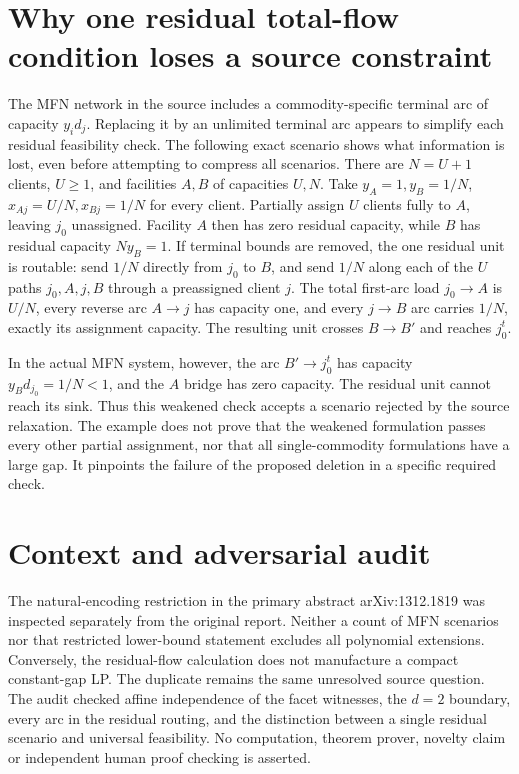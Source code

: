 \documentclass[11pt]{article}
\begin{document}
\section{Why one residual total-flow condition loses a source constraint}
The MFN network in the source includes a commodity-specific terminal arc
of capacity $y_i d_j$. Replacing it by an unlimited terminal arc appears to
simplify each residual feasibility check. The following exact scenario shows
what information is lost, even before attempting to compress all scenarios.
There are $N=U+1$ clients, $U\ge1$, and facilities $A,B$ of capacities $U,N$.
Take $y_A=1,y_B=1/N$, $x_{Aj}=U/N,x_{Bj}=1/N$ for every client.
Partially assign $U$ clients fully to $A$, leaving $j_0$ unassigned.
Facility $A$ then has zero residual capacity, while $B$ has residual capacity
$Ny_B=1$. If terminal bounds are removed, the one residual unit is routable:
send $1/N$ directly from $j_0$ to $B$, and send $1/N$ along each of the $U$
paths $j_0,A,j,B$ through a preassigned client $j$. The total first-arc load
$j_0\to A$ is $U/N$, every reverse arc $A\to j$ has capacity one,
and every $j\to B$ arc carries $1/N$, exactly its assignment capacity.
The resulting unit crosses $B\to B'$ and reaches $j_0^t$.

In the actual MFN system, however, the arc $B'\to j_0^t$ has capacity
$y_Bd_{j_0}=1/N<1$, and the $A$ bridge has zero capacity. The residual
unit cannot reach its sink. Thus this weakened check accepts a scenario
rejected by the source relaxation. The example does not prove that the
weakened formulation passes every other partial assignment, nor that all
single-commodity formulations have a large gap. It pinpoints the failure of
the proposed deletion in a specific required check.

\section{Context and adversarial audit}
The natural-encoding restriction in the primary abstract arXiv:1312.1819
was inspected separately from the original report. Neither a count of MFN
scenarios nor that restricted lower-bound statement excludes all polynomial
extensions. Conversely, the residual-flow calculation does not manufacture
a compact constant-gap LP. The duplicate remains the same unresolved source
question. The audit checked affine independence of the facet witnesses,
the $d=2$ boundary, every arc in the residual routing, and the distinction
between a single residual scenario and universal feasibility. No computation,
theorem prover, novelty claim or independent human proof checking is asserted.
\end{document}
